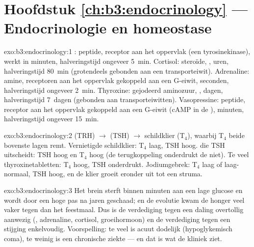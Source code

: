 \section*{Hoofdstuk \ref{ch:b3:endocrinology} --- Endocrinologie en homeostase}

\begin{solution}{exo:b3:endocrinology:1}
: peptide, receptor aan het oppervlak (een tyrosinekinase),
werkt in minuten, halveringstijd ongeveer \qty{5}{min}. Cortisol:
steroïde, , uren, halveringstijd \qty{80}{min} (grotendeels
gebonden aan een transporteiwit). Adrenaline: amine, receptoren aan het
oppervlak gekoppeld aan een G-eiwit, seconden, halveringstijd ongeveer
\qty{2}{min}. Thyroxine: gejodeerd aminozuur, , dagen,
halveringstijd \qty{7}{dagen} (gebonden aan transporteiwitten).
Vasopressine: peptide, receptor aan het oppervlak gekoppeld aan een
G-eiwit (cAMP in de ), minuten, halveringstijd ongeveer
\qty{15}{min}.
\end{solution}

\begin{solution}{exo:b3:endocrinology:2}
 (TRH) $\to$  (TSH) $\to$ schildklier (T$_{4}$),
waarbij T$_{4}$ beide bovenste lagen remt. Vernietigde schildklier:
T$_{4}$ laag, TSH hoog.  die TSH uitscheidt: TSH hoog en T$_{4}$
hoog (de terugkoppeling onderdrukt de  niet). Te veel
thyroxinetabletten: T$_{4}$ hoog, TSH onderdrukt. Jodiumgebrek:
T$_{4}$ laag of laag-normaal, TSH hoog, en de klier groeit eronder uit
tot een struma.
\end{solution}

\begin{solution}{exo:b3:endocrinology:3}
Het brein sterft binnen minuten aan een lage glucose en wordt door een
hoge pas na jaren geschaad; en de evolutie kwam de honger veel vaker
tegen dan het feestmaal. Dus is de verdediging tegen een daling
overtollig aanwezig (, adrenaline, cortisol, groeihormoon) en
de verdediging tegen een stijging enkelvoudig. Voorspelling: te veel
 is acuut dodelijk (hypoglykemisch coma), te weinig is een
chronische ziekte --- en dat is wat de kliniek ziet.
\end{solution}

